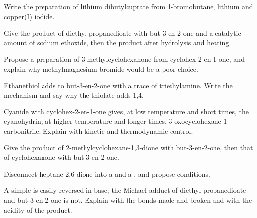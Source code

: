 \begin{exercise}[$\star$]\label{exo:b2:conjugate-additions:3}
Write the preparation of lithium dibutylcuprate from 1-bromobutane, lithium and copper(I) iodide.
\end{exercise}

\begin{exercise}[$\star$]\label{exo:b2:conjugate-additions:4}
Give the product of diethyl propanedioate with but-3-en-2-one and a catalytic amount of sodium
ethoxide, then the product after hydrolysis and heating.
\end{exercise}

\begin{exercise}[$\star\star$]\label{exo:b2:conjugate-additions:5}
Propose a preparation of 3-methylcyclohexanone from cyclohex-2-en-1-one, and explain why
methylmagnesium bromide would be a poor choice.
\end{exercise}

\begin{exercise}[$\star\star$]\label{exo:b2:conjugate-additions:6}
Ethanethiol adds to but-3-en-2-one with a trace of triethylamine. Write the mechanism and say why the
thiolate adds 1,4.
\end{exercise}

\begin{exercise}[$\star\star$]\label{exo:b2:conjugate-additions:7}
Cyanide with cyclohex-2-en-1-one gives, at low temperature and short times, the cyanohydrin; at higher
temperature and longer times, 3-oxocyclohexane-1-carbonitrile. Explain with kinetic and thermodynamic
control.
\end{exercise}

\begin{exercise}[$\star\star$]\label{exo:b2:conjugate-additions:8}
Give the  product of 2-methylcyclohexane-1,3-dione with but-3-en-2-one, then that
of cyclohexanone with but-3-en-2-one.
\end{exercise}

\begin{exercise}[$\star\star$]\label{exo:b2:conjugate-additions:9}
Disconnect heptane-2,6-dione into a  and a , and propose conditions.
\end{exercise}

\begin{exercise}[$\star\star\star$]\label{exo:b2:conjugate-additions:10}
A simple  is easily reversed in base; the Michael adduct of diethyl propanedioate and
but-3-en-2-one is not. Explain with the bonds made and broken and with the acidity of the product.
\end{exercise}

